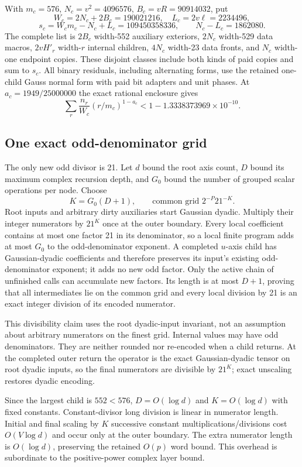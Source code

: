 With $m_c=576$, $N_c=v^2=4096576$, $B_c=vR=90914032$, put
\[
 W_c=2N_c+2B_c=190021216,\quad L_c=2v\ell=2234496,
\]
\[
 s_c=W_cm_c-N_c+L_c=109450358336,\qquad N_c-L_c=1862080.
\]
The complete list is $2B_c$ width-552 auxiliary exteriors,
$2N_c$ width-529 data macros, $2vH'_r$ width-$r$ internal children,
$4N_c$ width-23 data fronts, and $N_c$ width-one endpoint copies.
These disjoint classes include both kinds of paid copies and sum to
$s_c$. All binary residuals, including alternating forms, use the retained
one-child Gauss normal form with paid bit adapters and unit phases.
At $a_c=1949/25000000$ the exact rational enclosure gives
\[
 \sum_r\frac{n_r}{W_c}(r/m_c)^{1-a_c}
 <1-1.3338373969\times10^{-10}.
\]

\subsection{One exact odd-denominator grid}
The only new odd divisor is 21. Let $d$ bound the root axis count,
$D$ bound its maximum complex recursion depth, and $G_0$ bound the
number of grouped scalar operations per node. Choose
\[
 K=G_0(D+1),\qquad \text{common grid }2^{-P}21^{-K}.
\]
Root inputs and arbitrary dirty auxiliaries start Gaussian dyadic.
Multiply their integer numerators by $21^K$ once at the outer boundary.
Every local coefficient contains at most one factor 21 in its denominator,
so a local finite program adds at most $G_0$ to the odd-denominator
exponent. A completed $u$-axis child has Gaussian-dyadic coefficients
and therefore preserves its input's existing odd-denominator exponent;
it adds no new odd factor. Only the active chain of unfinished calls
can accumulate new factors. Its length is at most $D+1$, proving that
all intermediates lie on the common grid and every local division by
21 is an exact integer division of its encoded numerator.

This divisibility claim uses the root dyadic-input invariant, not an
assumption about arbitrary numerators on the finest grid. Internal values
may have odd denominators. They are neither rounded nor re-encoded when
a child returns. At the completed outer return the operator is the exact
Gaussian-dyadic tensor on root dyadic inputs, so the final numerators
are divisible by $21^K$; exact unscaling restores dyadic encoding.

Since the largest child is $552<576$, $D=O(\log d)$ and
$K=O(\log d)$ with fixed constants. Constant-divisor long division
is linear in numerator length. Initial and final scaling by $K$
successive constant multiplications/divisions cost $O(V\log d)$ and
occur only at the outer boundary. The extra numerator length is
$O(\log d)$, preserving the retained $O(p)$ word bound. This overhead
is subordinate to the positive-power complex layer bound.

